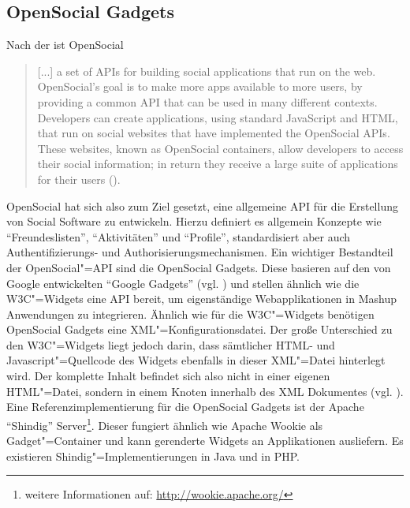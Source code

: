 \subsection{OpenSocial Gadgets}\label{section:opensocial_gadgets}
Nach der \cite{Opensocial2013} ist OpenSocial
\begin{quotation}
[...] a set of APIs for building social applications that run on the web. OpenSocial's goal is to make more apps available to more users, by providing a common API that can be used in many different contexts. Developers can create applications, using standard JavaScript and HTML, that run on social websites that have implemented the OpenSocial APIs. These websites, known as OpenSocial containers, allow developers to access their social information; in return they receive a large suite of applications for their users (\cite{Opensocial2013}).
\end{quotation}
OpenSocial hat sich also zum Ziel gesetzt, eine allgemeine API für die Erstellung von Social Software zu entwickeln. Hierzu definiert es allgemein Konzepte wie "`Freundeslisten"', "`Aktivitäten"' und "`Profile"', standardisiert aber auch Authentifizierungs- und Authorisierungsmechanismen. Ein wichtiger Bestandteil der OpenSocial"=API sind die OpenSocial Gadgets. Diese basieren auf den von Google entwickelten "`Google Gadgets"' (vgl. \cite{GoogleGadgetsApi2012}) und stellen ähnlich wie die W3C"=Widgets eine API bereit, um eigenständige Webapplikationen in Mashup Anwendungen zu integrieren. Ähnlich wie für die W3C"=Widgets benötigen OpenSocial Gadgets eine XML"=Konfigurationsdatei. Der große Unterschied zu den W3C"=Widgets liegt jedoch darin, dass sämtlicher HTML- und Javascript"=Quellcode des Widgets ebenfalls in dieser XML"=Datei hinterlegt wird. Der komplette Inhalt befindet sich also nicht in einer eigenen HTML"=Datei, sondern in einem Knoten innerhalb des XML Dokumentes (vgl. \cite{GoogleGadgetsApi2012}). Eine Referenzimplementierung für die OpenSocial Gadgets ist der Apache "`Shindig"' Server\footnote{weitere Informationen auf: \url{http://wookie.apache.org/}}. Dieser fungiert ähnlich wie Apache Wookie als Gadget"=Container und kann gerenderte Widgets an Applikationen ausliefern. Es existieren Shindig"=Implementierungen in Java und in PHP.

